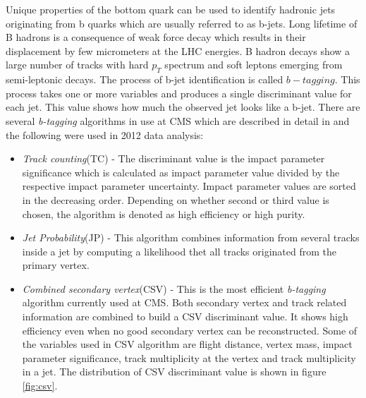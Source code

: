 Unique properties of the bottom quark can be used to identify hadronic jets originating from b quarks which are usually referred to as b-jets. Long lifetime of B hadrons is a consequence of weak force decay which results in their displacement by few micrometers at the LHC energies. B hadron decays show a large number of tracks with hard $p_T$ spectrum and soft leptons emerging from semi-leptonic decays. The process of b-jet identification is called $b-tagging$. This process takes one or more variables and produces a single discriminant value for each jet. This value shows how much the observed jet looks like a b-jet. There are several \textit{b-tagging} algorithms in use at CMS which are described in detail in \cite{Chatrchyan:2012jua} and the following were used in 2012 data analysis:
\begin{itemize}
	\item \textit{Track counting}(TC) - The discriminant value is the impact parameter significance which is calculated as impact parameter value divided by the respective impact parameter uncertainty. Impact parameter values are sorted in the decreasing order. Depending on whether second or third value is chosen, the algorithm is denoted as high efficiency or high purity. 
	\item \textit{Jet Probability}(JP) - This algorithm combines information from several tracks inside a jet by computing a likelihood thet all tracks originated from the primary vertex.  
	\item \textit{Combined secondary vertex}(CSV) - This is the most efficient \textit{b-tagging} algorithm currently used at CMS. Both secondary vertex and track related information are combined to build a CSV discriminant value. It shows high efficiency even when no good secondary vertex can be reconstructed. Some of the variables used in CSV algorithm are flight distance, vertex mass, impact parameter significance, track multiplicity at the vertex and track multiplicity in a jet. The distribution of CSV discriminant value is shown in figure \ref{fig:csv}.
\end{itemize}
